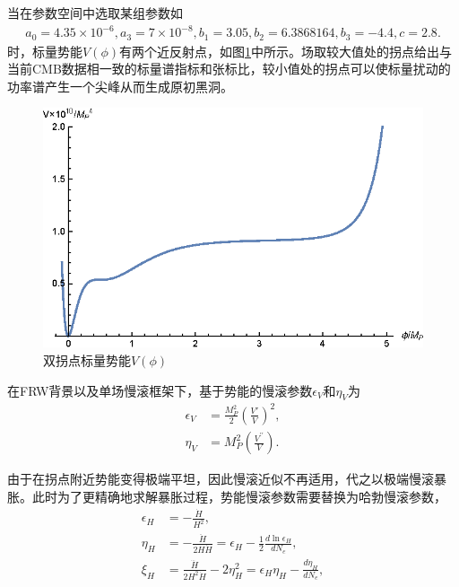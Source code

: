当在参数空间中选取某组参数如
\begin{align}\label{eq:parameters}
    a_0 = 4.35\times 10^{-6},
    a_3 = 7\times 10^{-8},
    b_1 = 3.05,
    b_2 = 6.3868164,
    b_3 = -4.4,
    c = 2.8.
\end{align}
时，标量势能$V(\phi)$有两个近反射点，如图\ref{fig:potential}中所示。场取较大值处的拐点给出与当前CMB数据相一致的标量谱指标和张标比，较小值处的拐点可以使标量扰动的功率谱产生一个尖峰从而生成原初黑洞。
\begin{figure}[!htbp]
    \centering
    \includegraphics{Img/potential.eps}
    \caption{双拐点标量势能$V(\phi)$}\label{fig:potential}
\end{figure}

在FRW背景以及单场慢滚框架下，基于势能的慢滚参数$\epsilon_V$和$\eta_V$为
\begin{align}
    \epsilon_V &= \frac{M^2_P}{2}{\left(\frac{V\prime}{V}\right)}^2, \\
    \eta_V &= M^2_P {\left(\frac{V^{\prime\prime}}{V}\right)}.
\end{align}

由于在拐点附近势能变得极端平坦，因此慢滚近似不再适用\citep{dimopoulos2017ultra,germani2017primordial}，代之以极端慢滚暴胀。此时为了更精确地求解暴胀过程，势能慢滚参数需要替换为哈勃慢滚参数\citep{schwarz2001higher,leach2002cosmological,schwarz2004primordial}，
\begin{align}
    \epsilon_H &= -\frac{\dot{H}}{H^2}, \\
    \eta_H &= -\frac{\ddot{H}}{2H\dot{H}}=\epsilon_H-\frac{1}{2}\frac{d \ln\epsilon_H}{dN_e}, \\
    \xi_H &=
    \frac{\dddot{H}}{2H^2\dot{H}}-2\eta^2_H=\epsilon_H\eta_H-\frac{d\eta_H}{dN_e},
\end{align}

